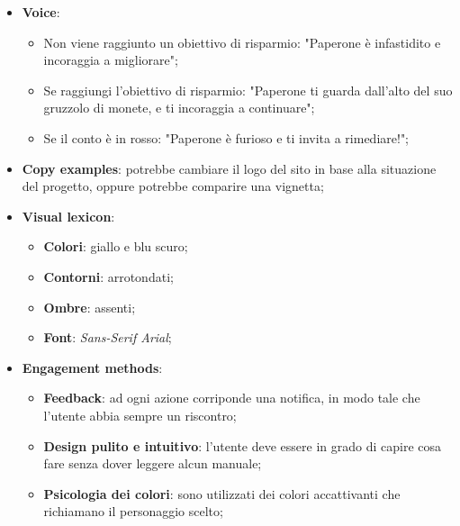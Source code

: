\begin{itemize}
\begin{center}
\begin{tikzpicture}
            \end{tikzpicture}
        \end{center}

    
    \item \textbf{Voice}: 
		\begin{itemize}
			\item Non viene raggiunto un obiettivo di risparmio: "Paperone è
				infastidito e incoraggia a migliorare";
				
			\item Se raggiungi l'obiettivo di risparmio: "Paperone ti guarda 
				dall'alto del suo gruzzolo di monete, e ti incoraggia a 
				continuare";

			\item Se il conto è in rosso: "Paperone è furioso e ti invita a 
				rimediare!";
		\end{itemize}
    
    \item \textbf{Copy examples}: potrebbe cambiare il logo del sito in base
		alla situazione del progetto, oppure potrebbe comparire una vignetta;
    
    \item \textbf{Visual lexicon}:
		\begin{itemize}
			\item \textbf{Colori}: giallo e blu scuro;
			\item \textbf{Contorni}: arrotondati;
			\item \textbf{Ombre}: assenti;
			\item \textbf{Font}: \textit{Sans-Serif Arial};
		\end{itemize}
    
    \item \textbf{Engagement methods}:
		\begin{itemize}
			\item \textbf{Feedback}: ad ogni azione corriponde una notifica, in
				modo tale che l'utente abbia sempre un riscontro;

			\item \textbf{Design pulito e intuitivo}: l'utente deve essere in
				grado di capire cosa fare senza dover leggere alcun manuale;

			\item \textbf{Psicologia dei colori}: sono utilizzati dei colori
				accattivanti che richiamano il personaggio scelto;
		\end{itemize}
\end{itemize}

